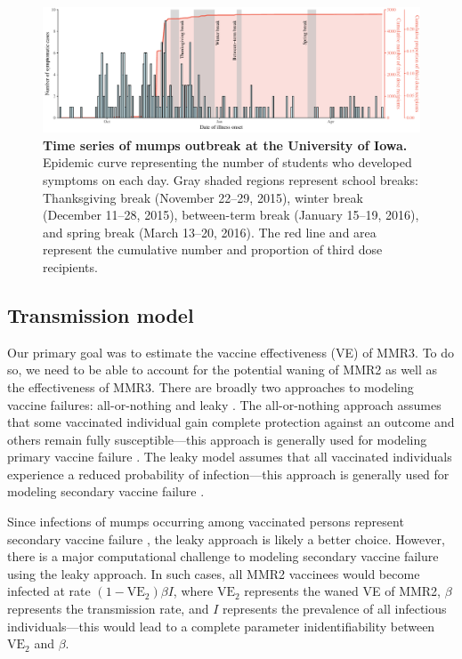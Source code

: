 \documentclass[12pt]{article}
\begin{document}
\begin{figure}[!th]
\includegraphics[width=\textwidth]{../figure/time_series.pdf}
\caption{
\textbf{Time series of mumps outbreak at the University of Iowa.}
Epidemic curve representing the number of students who developed symptoms on each day.
Gray shaded regions represent school breaks: Thanksgiving break (November 22--29, 2015), winter break (December 11--28, 2015), between-term break (January 15--19, 2016), and spring break (March 13--20, 2016).
The red line and area represent the cumulative number and proportion of third dose recipients.
}
\label{fig:data}
\end{figure}

\subsection{Transmission model}

Our primary goal was to estimate the vaccine effectiveness (VE) of MMR3.
To do so, we need to be able to account for the potential waning of MMR2 as well as the effectiveness of MMR3.
There are broadly two approaches to modeling vaccine failures: all-or-nothing and leaky \citep{smith1984assessment}.
The all-or-nothing approach assumes that some vaccinated individual gain complete protection against an outcome and others remain fully susceptible---this approach is generally used for modeling primary vaccine failure \citep{kanaan2002estimation}.
The leaky model assumes that all vaccinated individuals experience a reduced probability of infection---this approach is generally used for modeling secondary vaccine failure \citep{gokhale2023disentangling}.

Since infections of mumps occurring among vaccinated persons represent secondary vaccine failure \citep{vygen2016waning,kaaijk2020third,lam2020mumps}, the leaky approach is likely a better choice.
However, there is a major computational challenge to modeling secondary vaccine failure using the leaky approach.
In such cases, all MMR2 vaccinees would become infected at rate $(1-\mathrm{VE}_2) \beta I$, where $\mathrm{VE}_2$ represents the waned VE of MMR2, $\beta$ represents the transmission rate, and $I$ represents the prevalence of all infectious individuals---this would lead to a complete parameter inidentifiability between $\mathrm{VE}_2$ and $\beta$.
\end{document}
